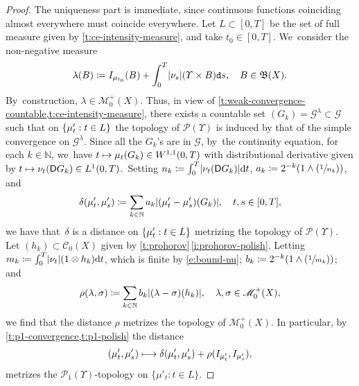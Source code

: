 \documentclass[10pt]{amsart}
\newcommand{\Psfrac}[2]{(\sfrac{#1}{#2})}
\newcommand\mto{\mathchoice{\longmapsto}{\mapsto}{\mapsto}{\mapsto}}
\theoremstyle{definition}
\theoremstyle{remark}
\DeclarePairedDelimiter{\paren}{\lparen}{\rparen}
\DeclarePairedDelimiter{\set}{\lbrace}{\rbrace}
\DeclarePairedDelimiter{\abs}{\lvert}{\rvert}
\begin{document}
\begin{proof}
The uniqueness part is immediate, since continuous functions coinciding almost everywhere must coincide everywhere.
Let $L \subset [0,T]$ be the set of full measure given by \cref{t:ce-intensity-measure}, and take $t_{0} \in [0,T]$. We~consider the non-negative measure
\begin{equation*}
\lambda(B) \coloneq I_{\mu_{t_{0}}}(B) + \int_{0}^{T} \abs{\nu_{s}}(\varUpsilon \times B) \mathtt{d} s, \quad B \in \mathfrak{B}(X).
\end{equation*}
By~construction, $\lambda \in \mathscr{M}_{0}^{+}(X)$.
Thus, in view of \cref{t:weak-convergence-countable,t:ce-intensity-measure}, there exists a countable set $(G_{k}) = \mathscr{G}^{\lambda} \subset \mathscr{G}$ such that on $\set{ \mu'_{t} : t \in L}$ the topology of $\mathscr{P}(\varUpsilon)$ is induced by that of the simple convergence on $\mathscr{G}^{\lambda}$.
Since all the $G_{k}$'s are in $\mathscr{G}$, by~the continuity equation, for each $k \in \mathbb{N}$, we~have $t\mto \mu_t(G_k)\in W^{1,1}(0,T)$ with distributional derivative given by $t \mto \nu_{t}(\mathsf{D} G_{k}) \in L^{1}(0,T)$.\
Setting $n_{k} \coloneq \int_{0}^{T} \abs{\nu_{t}(\mathsf{D}G_{k})} \mathrm{d} t$, $a_{k} \coloneq 2^{-k} \paren*{1 \wedge \Psfrac{1}{n_{k}}}$, and
\begin{equation*}
\delta(\mu'_{t}, \mu'_{s}) \coloneq \sum_{k \in \mathbb{N}} a_{k} \abs*{(\mu'_{t} - \mu'_{s})(G_{k})}, \quad t,s \in [0,T],
\end{equation*}
we have that~$\delta$ is a distance on $\set{ \mu'_{t}: t\in L}$ metrizing the topology of $\mathscr{P}(\varUpsilon)$.
Let $(h_{k}) \subset \mathscr{C}_{0}(X)$ given by \cref{t:prohorov}\,\cref{i:prohorov-polish}.
Letting $m_{k} \coloneq \int_{0}^{T} \abs{\nu_{t}}(1\otimes h_{k}) \mathrm{d} t$, which is finite by \cref{e:bound-nu}; $b_{k} \coloneq 2^{-k} (1 \wedge \Psfrac{1}{m_{k}})$; and
\begin{equation*}
\rho(\lambda, \sigma) \coloneq \sum_{k \in \mathbb{N}} b_{k} \abs{(\lambda - \sigma)(h_{k})}, \quad \lambda,\sigma \in \mathscr{M}_{0}^{+}(X),
\end{equation*}
we find that the distance $\rho$ metrizes the topology of $\mathscr{M}_{0}^{+}(X)$.
In particular, by \cref{t:p1-convergence,t:p1-polish} the distance
\begin{equation*}
(\mu'_{t}, \mu'_{s}) \mto \delta(\mu'_{t}, \mu'_{s}) + \rho(I_{\mu'_{t}}, I_{\mu'_{s}}),
\end{equation*}
metrizes the $\mathscr{P}_{1}(\varUpsilon)$-topology on $\{ \mu'_{t} : t \in L\}$.

\end{proof}
\end{document}
